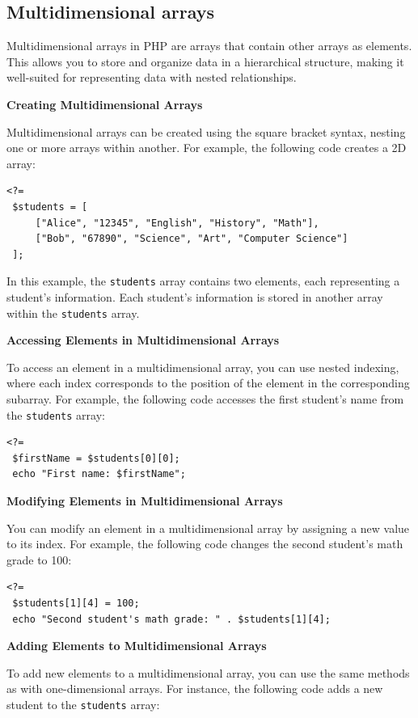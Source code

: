 \documentclass[11pt]{article}
\begin{document}
\subsection{Multidimensional arrays}
\label{sec:orga4bb55c}
Multidimensional arrays in PHP are arrays that contain other arrays as
elements. This allows you to store and organize data in a hierarchical
structure, making it well-suited for representing data with nested
relationships.

\textbf{Creating Multidimensional Arrays}

Multidimensional arrays can be created using the square bracket syntax,
nesting one or more arrays within another. For example, the following
code creates a 2D array:

\begin{verbatim}
<?=
 $students = [
     ["Alice", "12345", "English", "History", "Math"],
     ["Bob", "67890", "Science", "Art", "Computer Science"]
 ];
\end{verbatim}

In this example, the \texttt{students} array contains two elements, each
representing a student's information. Each student's information is
stored in another array within the \texttt{students} array.

\textbf{Accessing Elements in Multidimensional Arrays}

To access an element in a multidimensional array, you can use nested
indexing, where each index corresponds to the position of the element in
the corresponding subarray. For example, the following code accesses the
first student's name from the \texttt{students} array:

\begin{verbatim}
<?=
 $firstName = $students[0][0];
 echo "First name: $firstName";
\end{verbatim}

\textbf{Modifying Elements in Multidimensional Arrays}

You can modify an element in a multidimensional array by assigning a new
value to its index. For example, the following code changes the second
student's math grade to 100:

\begin{verbatim}
<?=
 $students[1][4] = 100;
 echo "Second student's math grade: " . $students[1][4];
\end{verbatim}

\textbf{Adding Elements to Multidimensional Arrays}

To add new elements to a multidimensional array, you can use the same
methods as with one-dimensional arrays. For instance, the following code
adds a new student to the \texttt{students} array:
\end{document}
